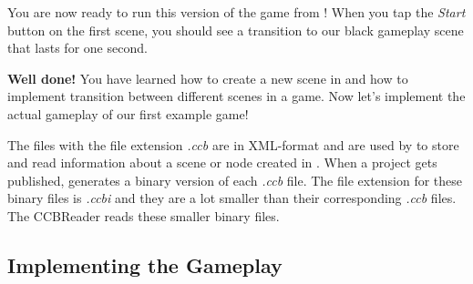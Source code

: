 You are now ready to run this version of the game from \xcode{}! When you tap
the \textit{Start} button on the first scene, you should see a transition to our
black gameplay scene that lasts for one second.

\textbf{Well done!} You have learned how to create a new scene in \SB{} and how
to implement transition between different scenes in a game. Now let's implement
the actual gameplay of our first example game!

\begin{details}[frametitle={.ccb and .ccbi}] 
The files with the file extension \textit{.ccb} are in XML-format and are used
by \SB{} to store and read information about a scene or node created in \SB{}.
When a \SB{} project gets published, \SB{} generates a binary version of
each \textit{.ccb} file. The file extension for these binary files is
\textit{.ccbi} and they are a lot smaller than their corresponding
\textit{.ccb} files. The CCBReader reads these smaller binary files.
\end{details}

\subsection{Implementing the Gameplay}
